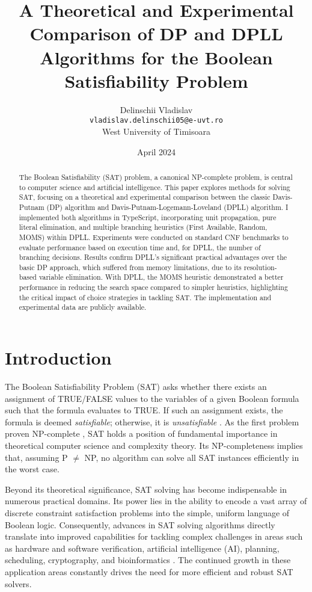 \documentclass[12pt, a4paper]{article}
\title{A Theoretical and Experimental Comparison of DP and DPLL Algorithms for the Boolean Satisfiability Problem}
\author{Delinschii Vladislav\\ \texttt{vladislav.delinschii05@e-uvt.ro} \\ West University of Timisoara}
\date{April 2024}
\begin{document}
\maketitle

\begin{abstract}
The Boolean Satisfiability (SAT) problem, a canonical NP-complete problem, is central to computer science and artificial intelligence. This paper explores methods for solving SAT, focusing on a theoretical and experimental comparison between the classic Davis-Putnam (DP) algorithm and Davis-Putnam-Logemann-Loveland (DPLL) algorithm. I implemented both algorithms in TypeScript, incorporating unit propagation, pure literal elimination, and multiple branching heuristics (First Available, Random, MOMS) within DPLL. Experiments were conducted on standard CNF benchmarks to evaluate performance based on execution time and, for DPLL, the number of branching decisions. Results confirm DPLL's significant practical advantages over the basic DP approach, which suffered from memory limitations, due to its resolution-based variable elimination. With DPLL, the MOMS heuristic demonstrated a better performance in reducing the search space compared to simpler heuristics, highlighting the critical impact of choice strategies in tackling SAT. The implementation and experimental data are publicly available.
\end{abstract}

\section{Introduction}
\label{sec:introduction} %

The Boolean Satisfiability Problem (SAT) asks whether there exists an assignment of TRUE/FALSE values to the variables of a given Boolean formula such that the formula evaluates to TRUE. If such an assignment exists, the formula is deemed \emph{satisfiable}; otherwise, it is \emph{unsatisfiable} \cite{Autoblocks}. As the first problem proven NP-complete \cite{Cook1971}, SAT holds a position of fundamental importance in theoretical computer science and complexity theory. Its NP-completeness implies that, assuming P $\neq$ NP, no algorithm can solve all SAT instances efficiently in the worst case.

Beyond its theoretical significance, SAT solving has become indispensable in numerous practical domains. Its power lies in the ability to encode a vast array of discrete constraint satisfaction problems into the simple, uniform language of Boolean logic. Consequently, advances in SAT solving algorithms directly translate into improved capabilities for tackling complex challenges in areas such as hardware and software verification, artificial intelligence (AI), planning, scheduling, cryptography, and bioinformatics \cite{Autoblocks}. The continued growth in these application areas constantly drives the need for more efficient and robust SAT solvers.
\end{document}

